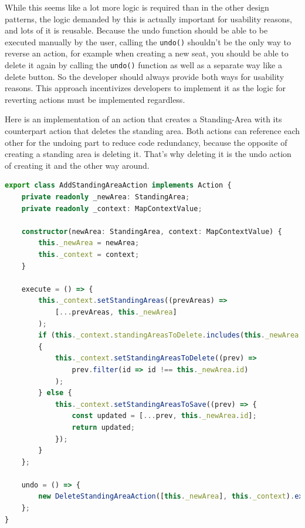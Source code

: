 While this seems like a lot more logic is required than in the other design patterns, the logic demanded by this is actually important for usability reasons, and lots of it is reusable. Because the undo function should be able to be executed manually by the user, calling the \texttt{undo()} shouldn't be the only way to reverse an action, for example when creating a new seat, you should be able to delete it again by calling the \texttt{undo()} function as well as a separate way like a delete button. So the developer should always provide both ways for usability reasons. This approach incentivizes developers to implement it as the logic for reverting actions must be implemented regardless.

Here is an implementation of an action that creates a Standing-Area with its counterpart action that deletes the standing area. Both actions can reference each other for the undoing part to reduce code redundancy, because the opposite of creating a standing area is deleting it. That's why deleting it is the undo action of creating it and the other way around.

\begin{lstlisting}[language=TypeScript,caption={Add standing-area action implementation},label={lst:add-standing-area-action-implementation}]
export class AddStandingAreaAction implements Action {
    private readonly _newArea: StandingArea;
    private readonly _context: MapContextValue;

    constructor(newArea: StandingArea, context: MapContextValue) {
        this._newArea = newArea;
        this._context = context;
    }

    execute = () => {
        this._context.setStandingAreas((prevAreas) => 
            [...prevAreas, this._newArea]
        );
        if (this._context.standingAreasToDelete.includes(this._newArea.id))
        {
            this._context.setStandingAreasToDelete((prev) =>
                prev.filter(id => id !== this._newArea.id)
            );
        } else {
            this._context.setStandingAreasToSave((prev) => {
                const updated = [...prev, this._newArea.id];
                return updated;
            });
        }
    };

    undo = () => {
        new DeleteStandingAreaAction([this._newArea], this._context).execute()
    };
}
\end{lstlisting}

